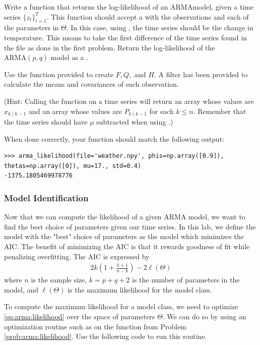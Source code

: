 \begin{problem}
\label{prob:arma:likelihood}
Write a function  that returns the log-likelihood of an ARMAmodel, given a time series $\{z_t\}_{t=1}^T$.
This function should accept a  with the observations and each of the parameters in $\Theta$. 
In this case, using , the time series should be the change in temperature.
This means to take the first difference of the time series found in the file  as done in the first problem.
Return the log-likelihood of the $\text{ARMA}(p,q)$ model as a .

Use the  function provided to create $F,Q,$ and $H$.
A  filter has been provided to calculate the means and covariances of each observation.

(Hint: Calling the function  on a time series will return an array whose values are $x_{k\mid k-1}$ and an array whose values are $P_{k\mid k-1}$ for each $k\leq n$.
Remember that the time series should have $\mu$ subtracted when using .)

When done correctly, your function should match the following output:
\begin{lstlisting}
>>> arma_likelihood(file='weather.npy', phis=np.array([0.9]), thetas=np.array([0]), mu=17., std=0.4)
-1375.1805469978776
\end{lstlisting}
\end{problem}

\subsubsection*{Model Identification}

Now that we can compute the likelihood of a given ARMA model, we want to find the best choice of parameters given our time series.
In this lab, we define the model with the "best" choice of parameters as the model which minimizes the AIC.
The benefit of minimizing the AIC is that it rewards goodness of fit while penalizing overfitting.
The AIC is expressed by
\begin{align}
    2k\left(1 + \frac{k+1}{n-k}\right) - 2 \ell(\Theta)
\end{align}
where $n$ is the sample size, $k = p + q + 2$ is the number of parameters in
the model, and $\ell(\Theta)$ is the maximum likelihood for the model class.

To compute the maximum likelihood for a model class, we need to optimize
\ref{eq:arma:likelihood} over the space of parameters $\Theta$. We can do so
by using an optimization routine such as  on the function  from Problem \ref{prob:arma:likelihood}.
Use the following code to run this routine.

